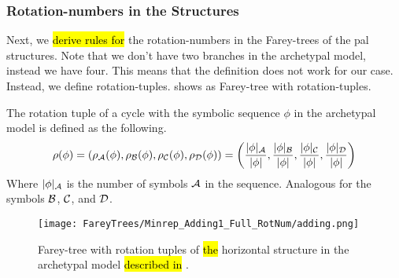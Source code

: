 \subsubsection{Rotation-numbers in the  Structures}

Next, we \hl{derive rules for} the rotation-numbers in the Farey-trees of the \gls{pal} structures.
Note that we don't have two branches in the archetypal model, instead we have four.
This means that the definition  does not work for our case.
Instead, we define rotation-tuples.
 shows as Farey-tree with rotation-tuples.

\begin{definition}
	The rotation tuple of a cycle with the symbolic sequence $\phi$ in the archetypal model is defined as the following.
	\begin{align}
		\rho(\phi)
		= \left(\rho_{\mathcal{A}}(\phi), \rho_{\mathcal{B}}(\phi), \rho_{\mathcal{C}}(\phi), \rho_{\mathcal{D}}(\phi)\right)
		= \left(\dfrac{|\phi|_{\mathcal{A}}}{|\phi|}, \dfrac{|\phi|_{\mathcal{B}}}{|\phi|}, \dfrac{|\phi|_{\mathcal{C}}}{|\phi|}, \dfrac{|\phi|_{\mathcal{D}}}{|\phi|}\right)
	\end{align}
	Where $|\phi|_{\mathcal{A}}$ is the number of symbols $\mathcal{A}$ in the sequence.
	Analogous for the symbols $\mathcal{B}$, $\mathcal{C}$, and $\mathcal{D}$.
\end{definition}

\begin{figure}
	\centering
	\texttt{[image: FareyTrees/Minrep\_Adding1\_Full\_RotNum/adding.png]}
	\caption[Farey-tree with rotation tuples of the horizontal  structure in the archetypal model described in ]{
		Farey-tree with rotation tuples of \hl{the} horizontal  structure in the archetypal model \hl{described in} .
	}
	\label{fig:add.prop.rot.num.tree}
\end{figure}

